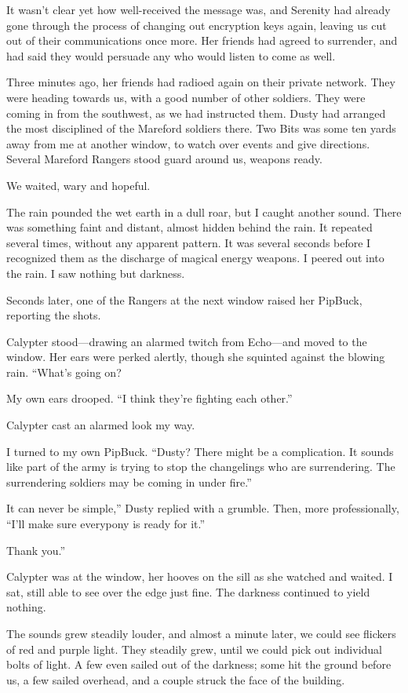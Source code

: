 It wasn’t clear yet how well-received the message was, and Serenity had already gone through the process of changing out encryption keys again, leaving us cut out of their communications once more. Her friends had agreed to surrender, and had said they would persuade any who would listen to come as well.

Three minutes ago, her friends had radioed again on their private network. They were heading towards us, with a good number of other soldiers. They were coming in from the southwest, as we had instructed them. Dusty had arranged the most disciplined of the Mareford soldiers there. Two Bits was some ten yards away from me at another window, to watch over events and give directions. Several Mareford Rangers stood guard around us, weapons ready.

We waited, wary and hopeful.

The rain pounded the wet earth in a dull roar, but I caught another sound. There was something faint and distant, almost hidden behind the rain. It repeated several times, without any apparent pattern. It was several seconds before I recognized them as the discharge of magical energy weapons. I peered out into the rain. I saw nothing but darkness.

Seconds later, one of the Rangers at the next window raised her PipBuck, reporting the shots.

Calypter stood—drawing an alarmed twitch from Echo—and moved to the window. Her ears were perked alertly, though she squinted against the blowing rain. “What’s going on?

My own ears drooped. “I think they’re fighting each other.”

Calypter cast an alarmed look my way.

I turned to my own PipBuck. “Dusty? There might be a complication. It sounds like part of the army is trying to stop the changelings who are surrendering. The surrendering soldiers may be coming in under fire.”

\leavevmode{}It can never be simple,” Dusty replied with a grumble. Then, more professionally, “I’ll make sure everypony is ready for it.”

\leavevmode{}Thank you.”

Calypter was at the window, her hooves on the sill as she watched and waited. I sat, still able to see over the edge just fine. The darkness continued to yield nothing.

The sounds grew steadily louder, and almost a minute later, we could see flickers of red and purple light. They steadily grew, until we could pick out individual bolts of light. A few even sailed out of the darkness; some hit the ground before us, a few sailed overhead, and a couple struck the face of the building.

